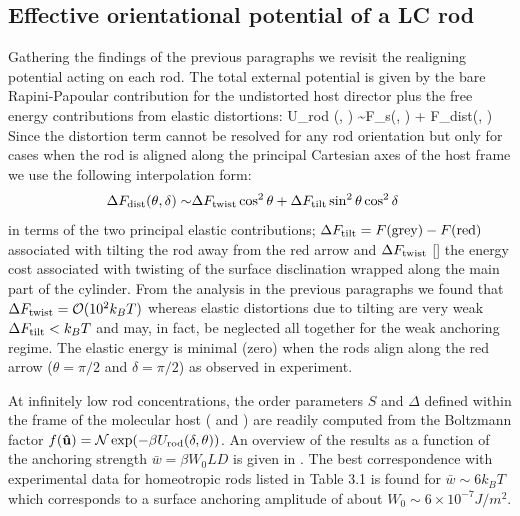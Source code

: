 \subsection{Effective orientational potential of a LC rod}

Gathering the findings of the previous paragraphs we revisit the realigning potential acting on each rod. The total external potential is given by the bare Rapini-Papoular contribution  for the undistorted host director plus the free energy contributions from elastic distortions:
\beq
U_{\rm rod} (\theta, \delta) \sim  F_{s}(\theta, \delta)  + \Delta F_{\rm dist}(\theta, \delta)
\eeq
Since the distortion term cannot be resolved for any rod orientation but only for cases when the rod is aligned along the principal Cartesian axes of the host frame we use the following interpolation form:
\begin{align}
\Delta F_{\rm dist} (\theta, \delta)  \sim & \Delta F_{\rm twist} \cos^{2} \theta  + \Delta F_{\rm tilt} \sin^{2} \theta \cos^{2} \delta
\end{align}
in terms of the two principal elastic  contributions;  $\Delta F_{\rm tilt} = F(\textrm{grey}) - F(\textrm{red})$ associated with tilting  the rod away from the red arrow and $\Delta F_{\rm twist}$ [] the energy cost associated with twisting of the surface disclination wrapped along the main part of the cylinder. From the analysis in the previous paragraphs we  found that $\Delta F_{\rm twist} = \mathcal{O}(10^{2} k_{B}T)$ whereas elastic distortions due to tilting are very weak $\Delta F_{\rm tilt} < k_{B}T$ and may, in fact, be neglected all together for the weak anchoring regime.  The  elastic energy is minimal (zero) when the rods align along the red arrow ($\theta = \pi/2$ and $ \delta= \pi/2 $) as observed in experiment.

At infinitely low rod concentrations, the order parameters $S$ and $\Delta$ defined within the frame of the  molecular host ( and ) are readily computed from the Boltzmann factor
  $f( {\bf \hat{u}} ) = \mathcal{N} \exp ( - \beta  U_{\rm rod} (\delta, \theta)   ) $.
An overview of the results as a function of the anchoring strength $\bar{w} = \beta W_{0} LD$ is given in . The best correspondence with experimental data for homeotropic rods listed in Table 3.1 is found for $ \bar{w} \sim 6 k_{B}T$ which corresponds to a surface anchoring  amplitude of about $W_{0}\sim 6 \times 10^{-7} J/m^{2}$.


